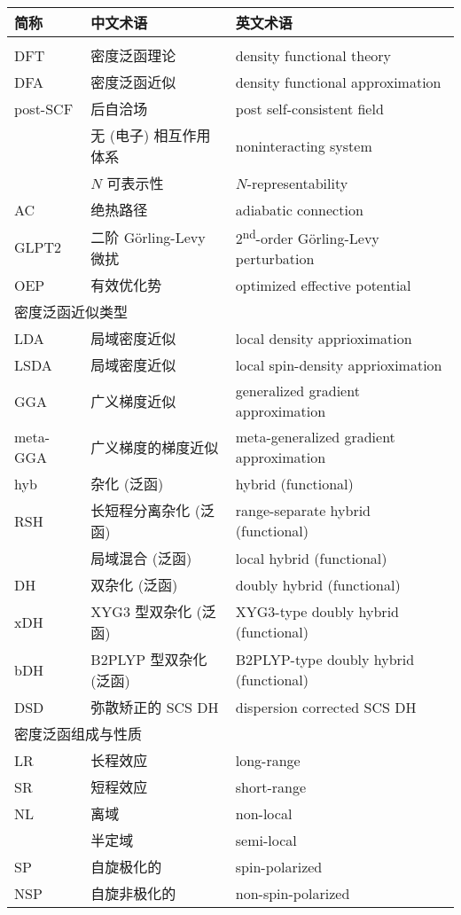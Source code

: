 \begin{longtable}{lll}
    \toprule 简称 & 中文术语 & 英文术语 \\ \midrule \endhead
    \bottomrule \endlastfoot
    \multicolumn{3}{l}{\textsf{密度泛函理论}} \\
    DFT & 密度泛函理论 & density functional theory \\
    DFA & 密度泛函近似 & density functional approximation \\
    post-SCF & 后自洽场 & post self-consistent field \\
    & 无 (电子) 相互作用体系 & noninteracting system \\
    & $N$ 可表示性 & $N$-representability \\
    AC & 绝热路径 & adiabatic connection \\
    GLPT2 & 二阶 G{\"o}rling-Levy 微扰 & 2\textsuperscript{nd}-order G{\"o}rling-Levy perturbation \\
    OEP & 有效优化势 & optimized effective potential \\
    \midrule
    \multicolumn{3}{l}{\textsf{密度泛函近似类型}} \\
    LDA & 局域密度近似 & local density apprioximation \\
    LSDA & 局域密度近似 & local spin-density apprioximation \\
    GGA & 广义梯度近似 & generalized gradient approximation \\
    meta-GGA & 广义梯度的梯度近似 & meta-generalized gradient approximation \\
    hyb & 杂化 (泛函) & hybrid (functional) \\
    RSH & 长短程分离杂化 (泛函) & range-separate hybrid (functional) \\
    & 局域混合 (泛函) & local hybrid (functional) \\
    DH & 双杂化 (泛函) & doubly hybrid (functional) \\
    xDH & XYG3 型双杂化 (泛函) & XYG3-type doubly hybrid (functional) \\
    bDH & B2PLYP 型双杂化 (泛函) & B2PLYP-type doubly hybrid (functional) \\
    DSD & 弥散矫正的 SCS DH & dispersion corrected SCS DH \\
    \midrule
    \multicolumn{3}{l}{\textsf{密度泛函组成与性质}} \\
    LR & 长程效应 & long-range \\
    SR & 短程效应 & short-range \\
    NL & 离域 & non-local \\
    & 半定域 & semi-local \\
    SP & 自旋极化的 & spin-polarized \\
    NSP & 自旋非极化的 & non-spin-polarized \\
\end{longtable}

